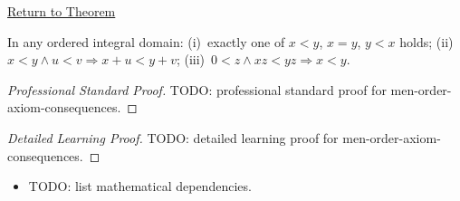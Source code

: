 \newpage
{}
\label{prf:men-order-axiom-consequences}

\begin{remark*}[Return]
\hyperref[thm:men-order-axiom-consequences]{Return to Theorem}
\end{remark*}

\begin{theorem*}
In any ordered integral domain:
(i)~exactly one of $x<y$, $x=y$, $y<x$ holds;
(ii)~$x<y \wedge u<v \Rightarrow x+u<y+v$;
(iii)~$0<z \wedge xz<yz \Rightarrow x<y$.
\end{theorem*}

\begin{proof}[Professional Standard Proof]
\LRAProofBodyStart
TODO: professional standard proof for men-order-axiom-consequences.
\end{proof}

\begin{proof}[Detailed Learning Proof]
\LRAProofBodyStart
TODO: detailed learning proof for men-order-axiom-consequences.
\end{proof}

\begin{remark*}
\end{remark*}

\begin{dependencies}
\begin{itemize}
  \item TODO: list mathematical dependencies.
\end{itemize}
\end{dependencies}

\clearpage
